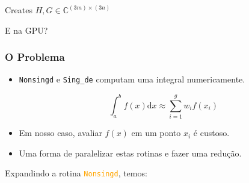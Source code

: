 \documentclass{beamer}
\newcommand{\Cfield}{\mathbb{C}}
\begin{document}

\begin{frame}
\begin{algorithm}[H]
\label{ghmatecd_openmp}
\caption{Creates $H, G \in \Cfield^{(3m)\times(3n)}$}
\begin{algorithmic}[1]
				\Else
				\EndIf
			\EndFor
	 \EndFor
	\EndProcedure
\end{algorithmic}
\end{algorithm}
E na GPU?
\end{frame}


\begin{frame}
\frametitle{O Problema}
\begin{itemize}
\item \texttt{Nonsingd} e \texttt{Sing\_de} computam uma integral numericamente.

\begin{equation}
	\int_{a}^{b} f(x)\text{d}x \approx \sum_{i = 1}^{g}w_i f(x_i) \label{quadrature} \nonumber
\end{equation}

\item Em nosso caso, avaliar $f(x)$ em um ponto $x_i$ é custoso.
\item Uma forma de paralelizar estas rotinas e fazer uma redução.

\end{itemize}
\end{frame}


Expandindo a rotina \textcolor{orange}{\texttt{Nonsingd}}, temos:
\end{document}
